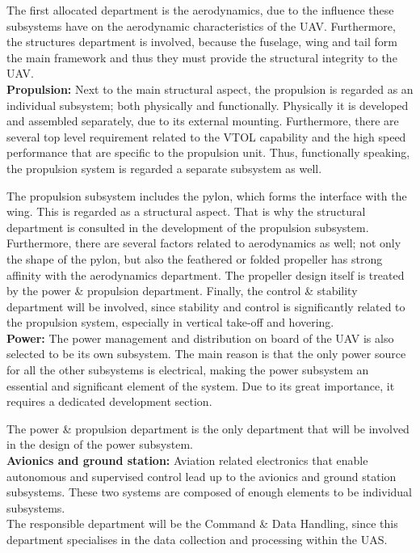 The first allocated department is the aerodynamics, due to the influence these subsystems have on the aerodynamic characteristics of the UAV.  Furthermore, the structures department is involved, because the fuselage, wing and tail form the main framework and thus they must provide the structural integrity to the UAV.\\

\noindent \textbf{Propulsion:} Next to the main structural aspect, the propulsion is regarded as an individual subsystem; both physically and functionally. Physically it is developed and assembled separately, due to its external mounting. Furthermore, there are several top level requirement related to the VTOL capability and the high speed performance that are specific to the propulsion unit. Thus, functionally speaking, the propulsion system is regarded a separate subsystem as well.

The propulsion subsystem includes the pylon, which forms the interface with the wing. This is regarded as a structural aspect. That is why the structural department is consulted in the development of the propulsion subsystem. Furthermore, there are several factors related to aerodynamics as well; not only the shape of the pylon, but also the feathered or folded propeller has strong affinity with the aerodynamics department. The propeller design itself is treated by the power \& propulsion department. Finally, the control \& stability department will be involved, since stability and control is significantly related to the propulsion system, especially in vertical take-off and hovering.\\

\noindent \textbf{Power:} The power management and distribution on board of the UAV is also selected to be its own subsystem. The main reason is that the only power source for all the other subsystems is electrical, making the power subsystem an essential and significant element of the system. Due to its great importance, it requires a dedicated development section.

The power \& propulsion department is the only department that will be involved in the design of the power subsystem.\\

\noindent \textbf{Avionics and ground station:} Aviation related electronics that enable autonomous and supervised control lead up to the avionics and ground station subsystems. These two systems are composed of enough elements to be individual subsystems. \\ \indent The responsible department will be the Command \& Data Handling, since this department specialises in the data collection and processing within the UAS.\\

